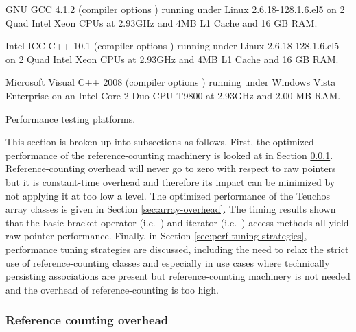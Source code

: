 \documentclass[pdf,ps2pdf,11pt]{SANDreport}
\begin{document}
\begin{table}
\begin{description}
%
{}\item[GCC 4.1.2:] GNU GCC 4.1.2 (compiler options {}) running under Linux 2.6.18-128.1.6.el5
on 2 Quad Intel Xeon CPUs at 2.93GHz and 4MB L1 Cache and 16 GB RAM.
%
{}\item[ICC 10.1:] Intel ICC C++ 10.1 (compiler options {}) running under Linux 2.6.18-128.1.6.el5
on 2 Quad Intel Xeon CPUs at 2.93GHz and 4MB L1 Cache and 16 GB RAM.
%
{}\item[MSVC++ 2008:] Microsoft Visual C++ 2008 (compiler options
{})
running under Windows Vista Enterprise on an Intel Core 2 Duo CPU
T9800 at 2.93GHz and 2.00 MB RAM.
%
\end{description}
\caption{\label{tbl:PerfTestPlatforms}
Performance testing platforms.}
\end{table}

This section is broken up into subsections as follows.  First, the
optimized performance of the reference-counting machinery is looked at
in Section {}\ref{sec:reference-counting-overhead}.
Reference-counting overhead will never go to zero with respect to raw
pointers but it is constant-time overhead and therefore its impact can
be minimized by not applying it at too low a level.  The optimized
performance of the Teuchos array classes is given in Section
{}\ref{sec:array-overhead}.  The timing results shown that the basic
bracket operator (i.e.\ {}) and iterator (i.e.\
{}) access methods all yield raw pointer
performance.  Finally, in Section {}\ref{sec:perf-tuning-strategies},
performance tuning strategies are discussed, including the need to
relax the strict use of reference-counting classes {}\ttt{RCP} and
especially {}\ttt{ArrayRCP} in use cases where technically
persisting associations are present but reference-counting machinery
is not needed and the overhead of reference-counting is too high.


%
{}\subsubsection{Reference counting overhead}
\label{sec:reference-counting-overhead}
%
\end{document}
